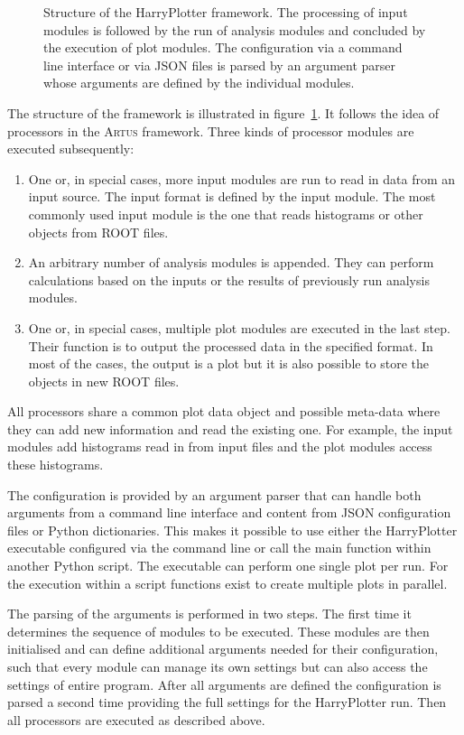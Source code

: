 \documentclass[3p]{elsarticle}
\newcommand{\software}[1]{\textsc{#1}\xspace}
\newcommand{\artus}{\software{Artus}}
\begin{document}
\begin{figure}[htb]
\centering 
\caption{Structure of the HarryPlotter framework.
The processing of input modules is followed by the run of analysis modules and concluded by the execution of plot modules.
The configuration via a command line interface or via JSON files is parsed by an argument parser whose arguments are defined by the individual modules.}
\label{figure_artus_harry_plotter}
\end{figure}

The structure of the framework is illustrated in figure~\ref{figure_artus_harry_plotter}.
It follows the idea of processors in the \artus framework.
Three kinds of processor modules are executed subsequently:
\begin{enumerate}
\item One or, in special cases, more input modules are run to read in data from an input source.
The input format is defined by the input module.
The most commonly used input module is the one that reads histograms or other objects from ROOT files.
\item An arbitrary number of analysis modules is appended.
They can perform calculations based on the inputs or the results of previously run analysis modules.
\item One or, in special cases, multiple plot modules are executed in the last step.
Their function is to output the processed data in the specified format.
In most of the cases, the output is a plot but it is also possible to store the objects in new ROOT files.
\end{enumerate}
All processors share a common plot data object and possible meta-data where they can add new information and read the existing one.
For example, the input modules add histograms read in from input files and the plot modules access these histograms.

The configuration is provided by an argument parser that can handle both arguments from a command line interface and content from JSON configuration files or Python dictionaries.
This makes it possible to use either the HarryPlotter executable configured via the command line or call the main function within another Python script.
The executable can perform one single plot per run.
For the execution within a script functions exist to create multiple plots in parallel.

The parsing of the arguments is performed in two steps.
The first time it determines the sequence of modules to be executed.
These modules are then initialised and can define additional arguments needed for their configuration, such that every module can manage its own settings but can also access the settings of entire program.
After all arguments are defined the configuration is parsed a second time providing the full settings for the HarryPlotter run.
Then all processors are executed as described above.
\end{document}

